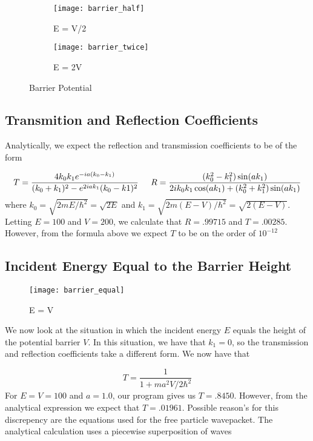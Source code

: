 \documentclass{article}
\begin{document}
\begin{figure}
\centering
\begin{subfigure}[h!]{0.3\textwidth}
\centering
\texttt{[image: barrier\_half]}
\caption{E = V/2}
\end{subfigure}
%
\begin{subfigure}[h!]{0.3\textwidth}
\centering
\texttt{[image: barrier\_twice]}
\caption{E = 2V}
\end{subfigure}

\caption{Barrier Potential}
\end{figure}


\subsection{Transmition and Reflection Coefficients}

Analytically, we expect the reflection and transmission coefficients to be of the form

\begin{equation}
T = \frac{4k_0 k_1 e^{-ia(k_0-k_1)}}{(k_0 + k_1)^2 - e^{2iak_1}(k_0-k1)^2} \hspace{0.2in} R = \frac{(k_0^2-k_1^2)\sin(ak_1)}{2ik_0k_1\cos(ak_1)+(k_0^2+k_1^2)\sin(ak_1)}
\end{equation}
%
where $k_0 = \sqrt{2mE/\hbar^2} = \sqrt{2E}$ and $k_1 = \sqrt{2m(E-V)/\hbar^2} = \sqrt{2(E-V)}$. Letting $E = 100$ and $V = 200$, we calculate that $R = .99715$ and $T = .00285$. However, from the formula above we expect $T$ to be on the order of $10^{-12}$

\subsection{Incident Energy Equal to the Barrier Height}

\begin{figure}
\centering
\texttt{[image: barrier\_equal]}
\caption{ E = V }
\end{figure}

We now look at the situation in which the incident energy $E$ equals the height of the potential barrier $V$. In this situation, we have that $k_1 = 0$, so the transmission and reflection coefficients take a different form. We now have that 

\begin{equation}
T = \frac{1}{1+ma^2V/2\hbar^2}
\end{equation}
%
For $ E = V = 100$ and $a=1.0$, our program gives us $T = .8450$. However, from the analytical expression we expect that $T = .01961$. Possible reason's for this discrepency are the equations used for the free particle wavepacket. The analytical calculation uses a piecewise superposition of waves
\end{document}

